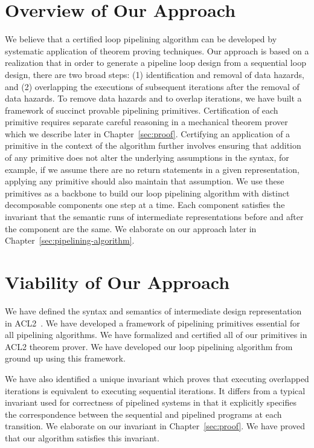 \section {Overview of Our Approach}
We believe that a certified loop pipelining algorithm can be developed by systematic application of theorem proving techniques. Our approach is based on a realization that in order to generate a pipeline loop design from a sequential loop design, there are two broad steps: (1) identification and removal of data hazards, and (2) overlapping the executions of subsequent iterations after the removal of data hazards. 
To remove data hazards and to overlap iterations, we have built a framework of succinct provable pipelining primitives.
Certification of each primitive requires separate careful reasoning in a mechanical theorem prover which we describe later in Chapter~\ref{sec:proof}. Certifying an application of a primitive in the context of the algorithm further involves ensuring that addition of any primitive does not alter the underlying assumptions in the syntax, for example, if we assume there are no return statements in a given representation, applying any primitive should also maintain that assumption. We use these primitives as a backbone to build our loop pipelining algorithm with distinct decomposable components one step at a time. %
Each component satisfies the invariant that the semantic runs of intermediate representations before and after the component are the same.  We elaborate on our approach later in Chapter~\ref{sec:pipelining-algorithm}.

\section{Viability of Our Approach}
We have defined the syntax and semantics of intermediate design representation in ACL2~\cite{disha-acl214}. We have developed a framework of pipelining primitives essential for all pipelining algorithms. We have formalized and certified all of our primitives in ACL2 theorem prover. We have developed our loop pipelining algorithm from ground up using this framework.

We have also identified a unique invariant which proves that executing overlapped iterations is equivalent to executing sequential iterations. It differs from a typical invariant used for correctness of pipelined
systems in that it explicitly specifies the correspondence between the
sequential and pipelined programs at each transition.  We elaborate on our invariant in Chapter~\ref{sec:proof}. 
We have proved that our algorithm satisfies this invariant.

